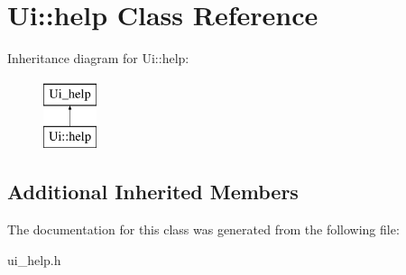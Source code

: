 \hypertarget{classUi_1_1help}{\section{Ui\-:\-:help Class Reference}
\label{classUi_1_1help}
}
Inheritance diagram for Ui\-:\-:help\-:\begin{figure}[H]
\begin{center}
\leavevmode
\includegraphics[height=2.000000cm]{classUi_1_1help}
\end{center}
\end{figure}
\subsection*{Additional Inherited Members}


The documentation for this class was generated from the following file\-:\begin{DoxyCompactItemize}
\item 
ui\-\_\-help.\-h\end{DoxyCompactItemize}

